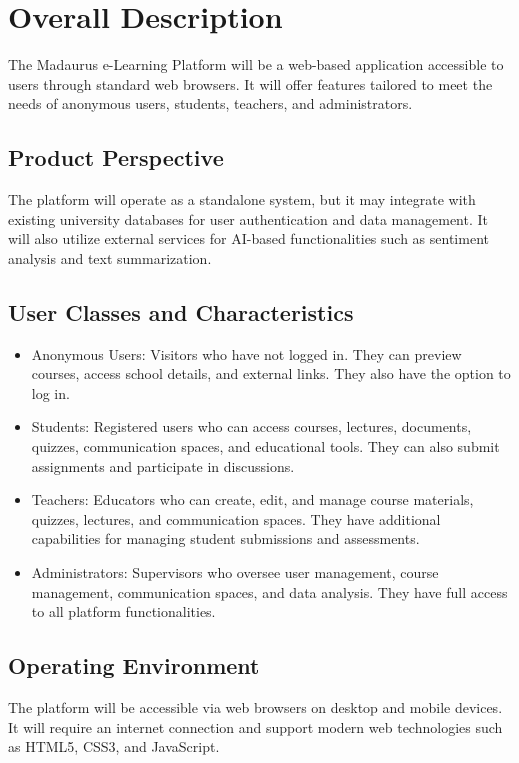 \documentclass{IEEEtran}
\begin{document}
\section{Overall Description}
The Madaurus e-Learning Platform will be a web-based application accessible to users through standard web browsers. It will offer features tailored to meet the needs of anonymous users, students, teachers, and administrators.

\subsection{Product Perspective}
The platform will operate as a standalone system, but it may integrate with existing university databases for user authentication and data management. It will also utilize external services for AI-based functionalities such as sentiment analysis and text summarization.

\subsection{User Classes and Characteristics}
\begin{itemize}[noitemsep]
\item Anonymous Users: Visitors who have not logged in. They can preview courses, access school details, and external links. They also have the option to log in.
\item Students: Registered users who can access courses, lectures, documents, quizzes, communication spaces, and educational tools. They can also submit assignments and participate in discussions.
\item Teachers: Educators who can create, edit, and manage course materials, quizzes, lectures, and communication spaces. They have additional capabilities for managing student submissions and assessments.
\item Administrators: Supervisors who oversee user management, course management, communication spaces, and data analysis. They have full access to all platform functionalities.
\end{itemize}

\subsection{Operating Environment}
The platform will be accessible via web browsers on desktop and mobile devices. It will require an internet connection and support modern web technologies such as HTML5, CSS3, and JavaScript.
\end{document}
